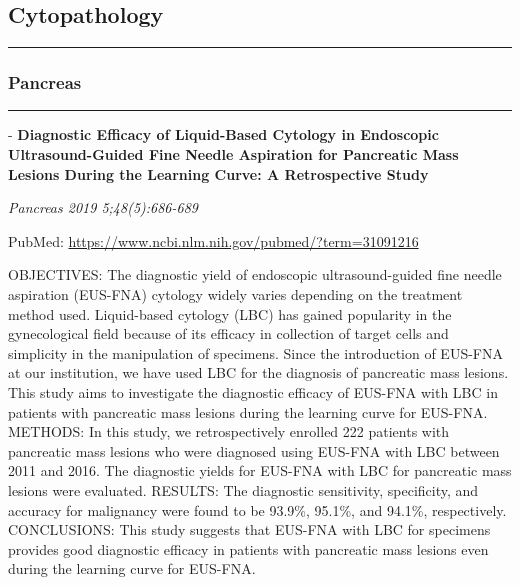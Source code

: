 \documentclass[]{article}
\begin{document}
\pagebreak

\hypertarget{cytopathology}{%
\subsection{Cytopathology}\label{cytopathology}}

\begin{center}\rule{0.5\linewidth}{\linethickness}\end{center}

\hypertarget{pancreas-1}{%
\subsubsection{Pancreas}\label{pancreas-1}}

\begin{center}\rule{0.5\linewidth}{\linethickness}\end{center}

 - \textbf{Diagnostic Efficacy of Liquid-Based Cytology in Endoscopic
Ultrasound-Guided Fine Needle Aspiration for Pancreatic Mass Lesions
During the Learning Curve: A Retrospective Study}

\emph{Pancreas 2019 5;48(5):686-689}

PubMed: \url{https://www.ncbi.nlm.nih.gov/pubmed/?term=31091216}

OBJECTIVES: The diagnostic yield of endoscopic ultrasound-guided fine
needle aspiration (EUS-FNA) cytology widely varies depending on the
treatment method used. Liquid-based cytology (LBC) has gained popularity
in the gynecological field because of its efficacy in collection of
target cells and simplicity in the manipulation of specimens. Since the
introduction of EUS-FNA at our institution, we have used LBC for the
diagnosis of pancreatic mass lesions. This study aims to investigate the
diagnostic efficacy of EUS-FNA with LBC in patients with pancreatic mass
lesions during the learning curve for EUS-FNA. METHODS: In this study,
we retrospectively enrolled 222 patients with pancreatic mass lesions
who were diagnosed using EUS-FNA with LBC between 2011 and 2016. The
diagnostic yields for EUS-FNA with LBC for pancreatic mass lesions were
evaluated. RESULTS: The diagnostic sensitivity, specificity, and
accuracy for malignancy were found to be 93.9\%, 95.1\%, and 94.1\%,
respectively. CONCLUSIONS: This study suggests that EUS-FNA with LBC for
specimens provides good diagnostic efficacy in patients with pancreatic
mass lesions even during the learning curve for EUS-FNA.
\end{document}
